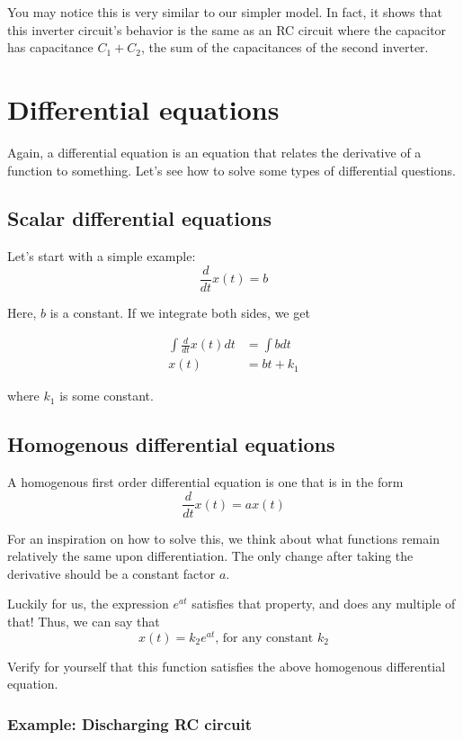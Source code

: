 \documentclass[11pt]{article}
\begin{document}
You may notice this is very similar to our simpler model. In fact, it shows that this inverter circuit's behavior is the same as an RC circuit where the capacitor has capacitance $C_1+C_2$, the sum of the capacitances of the second inverter.

\section{Differential equations}

Again, a differential equation is an equation that relates the derivative of a function to something. Let's see how to solve some types of differential questions.

\subsection{Scalar differential equations}

Let's start with a simple example: \[\frac d{dt}x(t)=b\]

Here, $b$ is a constant. If we integrate both sides, we get

\begin{align*}
    \int\frac d{dt}x(t)dt&=\int bdt\\
    x(t)&=bt+k_1
\end{align*}

where $k_1$ is some constant.

\subsection{Homogenous differential equations}

A homogenous first order differential equation is one that is in the form \[\frac d{dt}x(t)=ax(t)\]

For an inspiration on how to solve this, we think about what functions remain relatively the same upon differentiation. The only change after taking the derivative should be a constant factor $a$.

Luckily for us, the expression $e^{at}$ satisfies that property, and does any multiple of that! Thus, we can say that \[x(t)=k_2e^{at} \text{, for any constant $k_2$}\] 

Verify for yourself that this function satisfies the above homogenous differential equation.

\subsubsection{Example: Discharging RC circuit}
\end{document}
